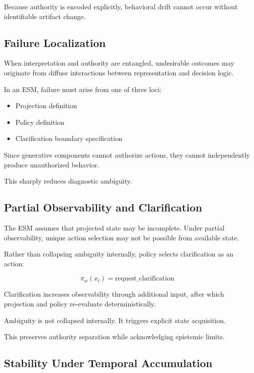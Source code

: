 \documentclass[11pt]{article}
\begin{document}
Because authority is encoded explicitly, behavioral drift cannot occur without identifiable artifact change.

\subsection{Failure Localization}

When interpretation and authority are entangled, undesirable outcomes may originate from diffuse interactions between representation and decision logic.

In an ESM, failure must arise from one of three loci:

\begin{itemize}
  \item Projection definition
  \item Policy definition
  \item Clarification boundary specification
\end{itemize}

Since generative components cannot authorize actions, they cannot independently produce unauthorized behavior.

This sharply reduces diagnostic ambiguity.

\subsection{Partial Observability and Clarification}

The ESM assumes that projected state may be incomplete. Under partial observability, unique action selection may not be possible from available state.

Rather than collapsing ambiguity internally, policy selects clarification as an action:

\[
\pi_w(x_t) = \text{request\_clarification}
\]

Clarification increases observability through additional input, after which projection and policy re-evaluate deterministically.

Ambiguity is not collapsed internally. It triggers explicit state acquisition.

This preserves authority separation while acknowledging epistemic limits.

\subsection{Stability Under Temporal Accumulation}
\end{document}
